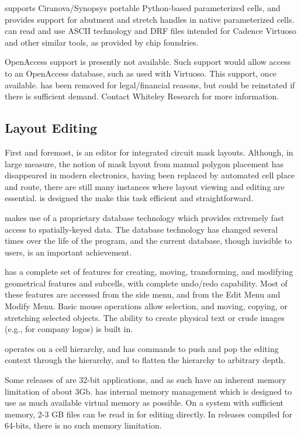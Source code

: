 {\Xic} supports Ciranova/Synopsys portable Python-based parameterized
cells, and provides support for abutment and stretch handles in native
parameterized cells.
\else
{\Xic} can read and use ASCII technology and DRF files intended for
Cadence Virtuoso and other similar tools, as provided by chip
foundries.

OpenAccess support is presently not available.  Such support would
allow access to an OpenAccess database, such as used with Virtuoso. 
This support, once available.  has been removed for legal/financial
reasons, but could be reinstated if there is sufficient demand. 
Contact Whiteley Research for more information.
\fi

\subsection{Layout Editing}

First and foremost, {\Xic} is an editor for integrated circuit mask
layouts.  Although, in large measure, the notion of mask layout from
manual polygon placement has disappeared in modern electronics, having
been replaced by automated cell place and route, there are still many
instances where layout viewing and editing are essential.  {\Xic} is
designed the make this task efficient and straightforward.

{\Xic} makes use of a proprietary database technology which provides
extremely fast access to spatially-keyed data.  The database
technology has changed several times over the life of the program, and
the current database, though invisible to users, is an important
achievement.

{\Xic} has a complete set of features for creating, moving,
transforming, and modifying geometrical features and subcells, with
complete undo/redo capability.  Most of these features are accessed
from the side menu, and from the {\cb Edit Menu} and {\cb Modify
Menu}.  Basic mouse operations allow selection, and moving, copying,
or stretching selected objects.  The ability to create physical text
or crude images (e.g., for company logos) is built in.

{\Xic} operates on a cell hierarchy, and has commands to push
and pop the editing context through the hierarchy, and to flatten
the hierarchy to arbitrary depth.

Some releases of {\Xic} are 32-bit applications, and as such have an
inherent memory limitation of about 3Gb.  {\Xic} has internal memory
management which is designed to use as much available virtual memory
as possible.  On a system with sufficient memory, 2-3 GB files can be
read in for editing directly.  In {\Xic} releases compiled for
64-bits, there is no such memory limitation.

